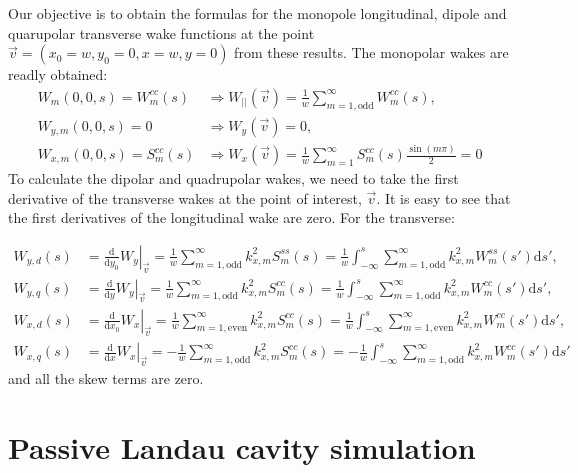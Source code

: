 \begin{apendicesenv}
    Our objective is to obtain the formulas for the monopole longitudinal, dipole and quarupolar transverse wake functions at the point $\vec{v} = (x_0=w,y_0=0,x=w,y=0)$ from these results. The monopolar wakes are readly obtained:
    \begin{align}
		W_m(0,0,s) = W^{cc}_m(s) &\Rightarrow W_{||}(\vec{v}) = \frac1w\sum^\infty_{m=1,\mathrm{odd}} W^{cc}_m(s), \\[4mm]
		W_{y,m}(0,0,s) = 0 &\Rightarrow W_y(\vec{v}) = 0, \\[4mm]
		W_{x,m}(0,0,s) = S^{cc}_m(s) &\Rightarrow W_x(\vec{v}) = \frac1w\sum^\infty_{m=1} S^{cc}_m(s)\frac{\sin(m\pi)}{2} = 0
    \end{align}
    To calculate the dipolar and quadrupolar wakes, we need to take the first derivative of the transverse wakes at the point of interest, $\vec{v}$. It is easy to see that the first derivatives of the longitudinal wake are zero. For the transverse:

    \begin{align}
		W_{y,d}(s) &= \left.\frac{\mathrm{d}}{\mathrm{d}y_0}W_y\right|_{\vec{v}} = \frac1w\sum^\infty_{m=1,\mathrm{odd}} k_{x,m}^2 S^{ss}_m(s) = \frac1w\int_{-\infty}^s\sum^\infty_{m=1,\mathrm{odd}} k_{x,m}^2 W^{ss}_m(s') \mathrm{d}s',\\[4mm]
		W_{y,q}(s) &= \left.\frac{\mathrm{d}}{\mathrm{d}y}W_y\right|_{\vec{v}} = \frac1w\sum^\infty_{m=1,\mathrm{odd}} k_{x,m}^2 S^{cc}_m(s) = \frac1w\int_{-\infty}^s\sum^\infty_{m=1,\mathrm{odd}} k_{x,m}^2 W^{cc}_m(s') \mathrm{d}s', \\[4mm]
		W_{x,d}(s) &= \left.\frac{\mathrm{d}}{\mathrm{d}x_0}W_x\right|_{\vec{v}} = \frac1w\sum^\infty_{m=1,\mathrm{even}} k_{x,m}^2 S^{cc}_m(s) = \frac1w\int_{-\infty}^s\sum^\infty_{m=1,\mathrm{even}}k_{x,m}^2 W^{cc}_m(s') \mathrm{d}s', \\[4mm]
		W_{x,q}(s) &= \left.\frac{\mathrm{d}}{\mathrm{d}x}W_x\right|_{\vec{v}} = -\frac1w\sum^\infty_{m=1,\mathrm{odd}} k_{x,m}^2 S^{cc}_m(s) =-\frac1w\int_{-\infty}^s\sum^\infty_{m=1,\mathrm{odd}} k_{x,m}^2 W^{cc}_m(s') \mathrm{d}s'
    \end{align}
    and all the skew terms are zero.


\chapter{Passive Landau cavity simulation}\label{eq:passive_landau_cavity}


\end{apendicesenv}
